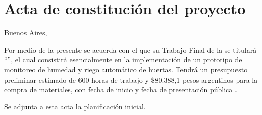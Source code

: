 \documentclass[
11pt, %
codirector, %
]{charter}
\begin{document}
\pagebreak



\section*{Acta de constitución del proyecto}
\label{sec:acta}

\begin{flushright}
Buenos Aires, \fechaInicioName
\end{flushright}

\vspace{2cm}

Por medio de la presente se acuerda con el \authorname\hspace{1px} que su Trabajo Final de la \degreename\hspace{1px} se titulará ``\ttitle'', el cual consistirá esencialmente en la implementación de un prototipo de monitoreo de humedad y riego automático de huertas. Tendrá un presupuesto preliminar estimado de {600} horas de trabajo y {\$80.388,1 pesos argentinos} para la compra de materiales, con fecha de inicio \fechaInicioName\hspace{1px} y fecha de presentación pública \fechaFinalName.

Se adjunta a esta acta la planificación inicial.

\vfill
\end{document}
